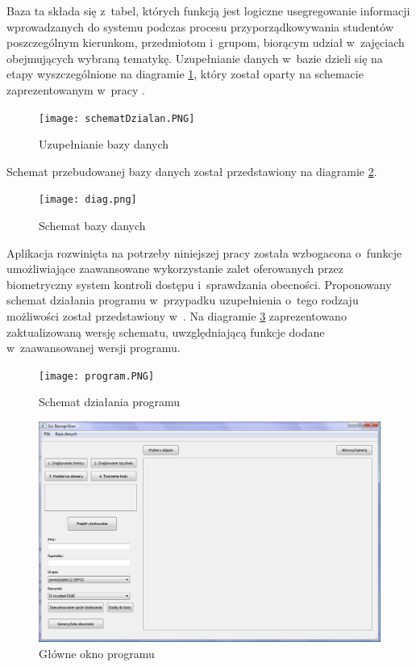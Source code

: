 Baza ta składa się z~tabel, których funkcją jest logiczne usegregowanie informacji wprowadzanych do systemu podczas procesu przyporządkowywania studentów poszczególnym kierunkom, przedmiotom i~grupom, biorącym udział w~zajęciach obejmujących wybraną tematykę. Uzupełnianie danych w~bazie dzieli się na etapy wyszczególnione na diagramie \ref{fig:etapyDzialania}, który został oparty na schemacie zaprezentowanym w~pracy \cite{Gl11}.

\begin{figure}
\begin{center}
\texttt{[image: schematDzialan.PNG]}
\caption{Uzupełnianie bazy danych}
\label{fig:etapyDzialania}
\end{center}
\end{figure}

Schemat przebudowanej bazy danych został przedstawiony na diagramie \ref{fig:bazaDanych}.

\begin{figure}
\begin{center}
\texttt{[image: diag.png]}
\caption{Schemat bazy danych}
\label{fig:bazaDanych}
\end{center}
\end{figure}

Aplikacja rozwinięta na potrzeby niniejszej pracy została wzbogacona o~funkcje umożliwiające zaawansowane wykorzystanie zalet oferowanych przez biometryczny system kontroli dostępu i~sprawdzania obecności. Proponowany schemat działania programu w~przypadku uzupełnienia o~tego rodzaju możliwości został przedstawiony w~\cite{Gl11}. Na diagramie \ref{fig:program} zaprezentowano zaktualizowaną wersję schematu, uwzględniającą funkcje dodane w~zaawansowanej wersji programu.


\begin{figure}
\begin{center}
\texttt{[image: program.PNG]}
\caption{Schemat działania programu}
\label{fig:program}
\end{center}
\end{figure}


\begin{figure}[h!]
\begin{center}
\includegraphics[scale=0.5]{okno_glowne.jpg}
\caption{Główne okno programu}
\label{fig:oknoGlowne}
\end{center}
\end{figure}

